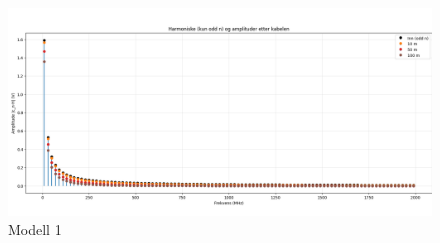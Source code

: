 \begin{figure}[h]
    \centering
    \includegraphics[width=1\textwidth]{Media/modellering1.png}
    \caption{Modell 1}
    \label{fig:modell1}
\end{figure}
